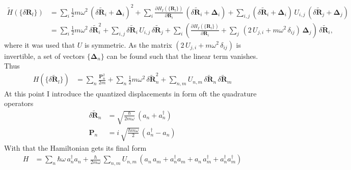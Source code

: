 \begin{align*}
    \tilde{H}(\{\delta\mathbf{R}_l\})&= \sum_i \frac12 m \omega^2 \,(\delta\tilde{\mathbf{R}}_i+\mathbf{\Delta}_i)^2+ \sum_i\frac{\partial H_I(\{\mathbf{R}_l\})}{\partial \mathbf{R}_i}\,(\delta\tilde{\mathbf{R}}_i+\mathbf{\Delta}_i) + \sum_{i,j}(\delta\tilde{\mathbf{R}}_i+\mathbf{\Delta}_i)\,U_{i,j}\,(\delta\tilde{\mathbf{R}}_j+\mathbf{\Delta}_j)\\
    &= \sum_i \frac12 m \omega^2 \,\delta\tilde{\mathbf{R}}_i^2  + \sum_{i,j}\delta\tilde{\mathbf{R}}_i\,U_{i,j}\,\delta\tilde{\mathbf{R}}_j + \sum_i\left(\frac{\partial H_I(\{\mathbf{R}_l\})}{\partial \mathbf{R}_i} +\sum_j\,\left( 2\, U_{j,i} + m\omega^2\,\delta_{ij}\right)\,\mathbf{\Delta}_j  \right)\,\delta\tilde{\mathbf{R}}_i,
\end{align*}
where it was used that $U$ is symmetric. As the matrix $\left( 2\, U_{j,i} + m\omega^2\,\delta_{ij}\right)$ is invertible, a set of vectors $\{\mathbf{\Delta}_n\}$ can be found such that the linear term vanishes.
Thus
\begin{align*}
    H(\{\delta\tilde{\mathbf{R}}_l\})&= \sum_n\frac{\mathbf{P}_n^2}{2m}+ \sum_n\frac12 m\omega^2\,\delta\tilde{\mathbf{R}}_n^2+ \sum_{n,m}U_{n,m}\,\delta\tilde{\mathbf{R}}_n\,\delta\tilde{\mathbf{R}}_m
\end{align*}
At this point I introduce the quantized displacements in form oft the quadrature operators 
\begin{align*}
    \delta\tilde{\mathbf{R}}_n &= \sqrt{\frac{\hbar}{2m\omega}}\,(a_n + a_n^\dagger)\\
    \mathbf{P}_n &= i\,\sqrt{\frac{\hbar m\omega}{2}}\,(a_n^\dagger - a_n)
\end{align*}
With that the Hamiltonian gets its final form
\begin{align*}
    H &= \sum_n \hbar\omega\,a_n^\dagger a_n +\frac{\hbar}{2m\omega}\, \sum_{n,m} U_{n,m}\,\left(a_n\,a_m + a_n^\dagger a_m + a_n\,a_m^\dagger + a_n^\dagger a_m^\dagger \right)
\end{align*}\hfill\newpage

